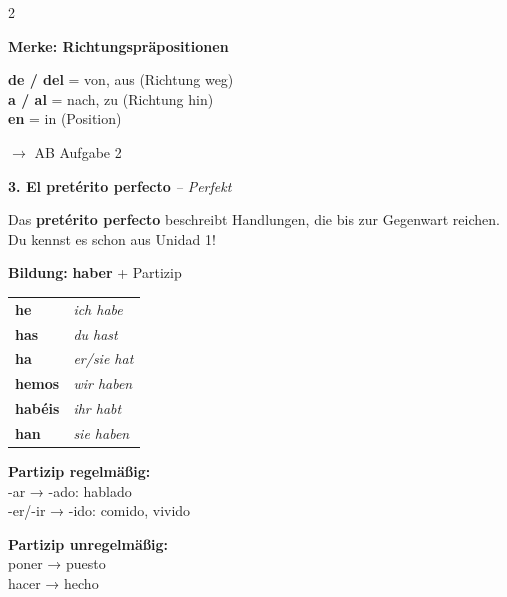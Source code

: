 \documentclass[11pt, a4paper]{article}
\newcommand{\seriftext}[1]{{\fontfamily{ppl}\selectfont #1}}
\newcommand{\es}[1]{\seriftext{\textbf{#1}}}
\newcommand{\de}[1]{\textit{\textcolor{akzent}{#1}}}
\newcommand{\abmark}[1]{{\footnotesize\textcolor{akzent}{$\rightarrow$ AB #1}}}
\newcommand{\abschnitt}[2]{\noindent\textbf{\large #1. #2}}
\newcommand{\stamm}[1]{\textcolor{colorrojo}{#1}}
\begin{document}
\begin{multicols}{2}
\begin{merkbox}
\textbf{Merke: Richtungspräpositionen}

\vspace{2pt}
{\small
\textbf{de / del} = von, aus (Richtung weg)\\
\textbf{a / al} = nach, zu (Richtung hin)\\
\textbf{en} = in (Position)}
\end{merkbox}

\abmark{Aufgabe 2}

\columnbreak

\abschnitt{3}{El pretérito perfecto} \de{-- Perfekt}

\vspace{4pt}

Das \es{pretérito perfecto} beschreibt Handlungen, die bis zur Gegenwart reichen. Du kennst es schon aus Unidad 1!

\begin{grammatikbox}
\textbf{Bildung:} \es{haber} + Partizip

\vspace{4pt}

{\small
\begin{tabular}{@{}ll@{}}
\es{he} & \de{ich habe} \\
\es{has} & \de{du hast} \\
\es{ha} & \de{er/sie hat} \\
\es{hemos} & \de{wir haben} \\
\es{habéis} & \de{ihr habt} \\
\es{han} & \de{sie haben} \\
\end{tabular}}

\vspace{4pt}

{\small
\textbf{Partizip regelmäßig:}\\
-ar → \stamm{-ado}: habl\stamm{ado}\\
-er/-ir → \stamm{-ido}: com\stamm{ido}, viv\stamm{ido}
}

\vspace{4pt}

{\small
\textbf{Partizip unregelmäßig:}\\
poner → \stamm{puesto}\\
hacer → \stamm{hecho}
}
\end{grammatikbox}


\end{multicols}
\end{document}
